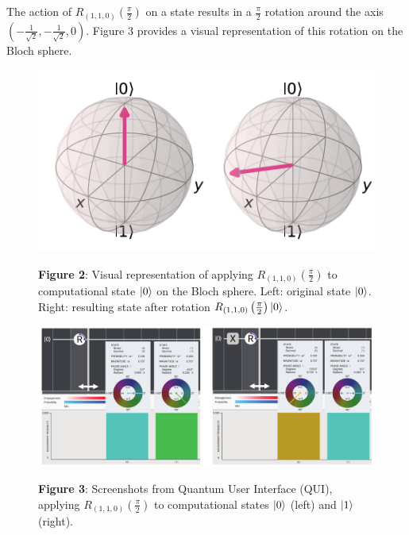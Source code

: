 The action of $R_{(1,1,0)}\left(\frac{\pi}{2}\right)$ on a state results in a $\frac{\pi}{2}$ rotation around the axis $(-\frac{1}{\sqrt{2}}, -\frac{1}{\sqrt{2}}, 0)$.
Figure 3 provides a visual representation of this rotation on the Bloch sphere.

\begin{figure}[H]
	\captionlistentry{}
	\label{fig:rotation-visualisation}
	\begin{center}
	\includegraphics[width=0.85\linewidth]{graphics/q1c-1.pdf}
	\end{center}
    \textsf{\footnotesize{\textbf{Figure 2}: Visual representation of applying $R_{(1,1,0)}\left(\frac{\pi}{2}\right)$ to computational state $\ket{0}$ on the Bloch sphere. Left: original state $\ket{0}$. Right:  resulting state after rotation $R_{(1,1,0)}\left(\frac{\pi}{2}\right)\ket{0}$.}}
\end{figure}

\begin{figure}[H]
	\captionlistentry{}
	\label{fig:QUI-rotation-screenshots}
	\begin{center}
	\includegraphics[width=0.85\linewidth]{graphics/q1c-2.pdf}
	\end{center}
    \textsf{\footnotesize{\textbf{Figure 3}: Screenshots from Quantum User Interface (QUI), applying $R_{(1,1,0)}\left(\frac{\pi}{2}\right)$ to computational states $\ket{0}$ (left) and $\ket{1}$ (right).}}
\end{figure}